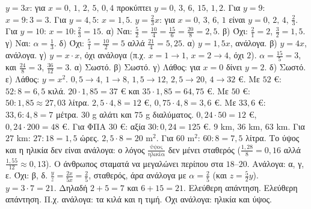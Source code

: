  $y=3x$: για $x=0,\,1,\,2,\,5,\,0{,}4$ προκύπτει $y=0,\,3,\,6,\,15,\,1{,}2$. Για $y=9$: $x=9:3=3$. Για $y=4{,}5$: $x=1{,}5$.
 $y=\frac{2}{3}x$: για $x=0,\,3,\,6,\,1$ είναι $y=0,\,2,\,4,\,\frac{2}{3}$. Για $y=10$: $x=10:\frac{2}{3}=15$.
 α) Ναι: $\frac{5}{2}=\frac{10}{4}=\frac{15}{6}=\frac{20}{8}=2{,}5$. β) Όχι: $\frac{2}{1}=2$, $\frac{3}{2}=1{,}5$. γ) Ναι: $\alpha=\frac{1}{3}$. δ) Όχι: $\frac{5}{1}=\frac{10}{2}=5$ αλλά $\frac{21}{4}=5{,}25$.
 α) $y=1{,}5x$, ανάλογα. β) $y=4x$, ανάλογα. γ) $y=x\cdot x$, όχι ανάλογα (π.χ. $x=1\to1$, $x=2\to4$, όχι $2$).
 $\alpha=\frac{15}{5}=3$, και $\frac{24}{8}=3$, $\frac{36}{12}=3$.
 α) Σωστό. β) Σωστό. γ) Λάθος: για $x=0$ δίνει $y=2$. δ) Σωστό. ε) Λάθος: $y=x^2$.
 $0{,}5\to4$, $1\to8$, $1{,}5\to12$, $2{,}5\to20$, $4\to32$ €. Με $52$ €: $52:8=6{,}5$ κιλά.
 $20\cdot1{,}85=37$ € και $35\cdot1{,}85=64{,}75$ €. Με $50$ €: $50:1{,}85\approx27{,}03$ λίτρα.
 $2{,}5\cdot4{,}8=12$ €, $0{,}75\cdot4{,}8=3{,}6$ €. Με $33{,}6$ €: $33{,}6:4{,}8=7$ μέτρα.
 $30$ g αλάτι και $75$ g διαλύματος.
 $0{,}24\cdot50=12$ €, $0{,}24\cdot200=48$ €. Για ΦΠΑ $30$ €: αξία $30:0{,}24=125$ €.
 $9$ km, $36$ km, $63$ km. Για $27$ km: $27:18=1{,}5$ ώρες.
 $2{,}5\cdot8=20$ m$^2$. Για $60$ m$^2$: $60:8=7{,}5$ λίτρα.
 Το ύψος και η ηλικία δεν είναι ανάλογα: ο λόγος $\frac{\text{ύψος}}{\text{ηλικία}}$ δεν μένει σταθερός ($\frac{1{,}28}{8}=0{,}16$ αλλά $\frac{1{,}55}{12}\approx0{,}13$). Ο άνθρωπος σταματά να μεγαλώνει περίπου στα $18$--$20$.
 Ανάλογα: α, γ, ε. Όχι: β, δ.
 $\frac{y}{z}=\frac{2x}{5x}=\frac{2}{5}$, σταθερός, άρα ανάλογα με $\alpha=\frac{2}{5}$ (και $z=\frac{5}{2}y$).
 $y=3\cdot7=21$. Δηλαδή $2+5=7$ και $6+15=21$.
 Ελεύθερη απάντηση.
 Ελεύθερη απάντηση. Π.χ. ανάλογα: τα κιλά και η τιμή. Όχι ανάλογα: ηλικία και ύψος.
